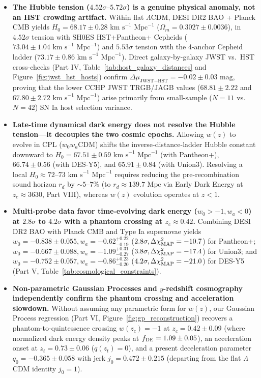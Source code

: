 \documentclass[11pt,letterpaper]{article}
\begin{document}
\begin{itemize}
    \setlength{\itemsep}{6pt}
    \item[\textcolor{tealaccent}{\textbullet}] \textbf{The Hubble tension ($4.52\sigma\text{--}5.72\sigma$) is a genuine physical anomaly, not an HST crowding artifact.} Within flat $\Lambda$CDM, DESI DR2 BAO + Planck CMB yields $H_0 = 68.17 \pm 0.28\text{ km s}^{-1}\text{ Mpc}^{-1}$ ($\Omega_m = 0.3027 \pm 0.0036$), in $4.52\sigma$ tension with SH0ES HST+Pantheon+ Cepheids ($73.04 \pm 1.04\text{ km s}^{-1}\text{ Mpc}^{-1}$) and $5.53\sigma$ tension with the 4-anchor Cepheid ladder ($73.17 \pm 0.86\text{ km s}^{-1}\text{ Mpc}^{-1}$). Direct galaxy-by-galaxy JWST vs.\ HST cross-checks (Part IV, Table~\ref{tab:host_galaxy_distances} and Figure~\ref{fig:jwst_hst_hosts}) confirm $\Delta\mu_{\text{JWST}-\text{HST}} = -0.02 \pm 0.03\text{ mag}$, proving that the lower CCHP JWST TRGB/JAGB values ($68.81 \pm 2.22$ and $67.80 \pm 2.72\text{ km s}^{-1}\text{ Mpc}^{-1}$) arise primarily from small-sample ($N=11$ vs.\ $N=42$) SN Ia host selection variance.
    \item[\textcolor{tealaccent}{\textbullet}] \textbf{Late-time dynamical dark energy does not resolve the Hubble tension---it decouples the two cosmic epochs.} Allowing $w(z)$ to evolve in CPL ($w_0 w_a$CDM) shifts the inverse-distance-ladder Hubble constant downward to $H_0 = 67.51 \pm 0.59\text{ km s}^{-1}\text{ Mpc}^{-1}$ (with Pantheon+), $66.74 \pm 0.56$ (with DES-Y5), and $65.91 \pm 0.84$ (with Union3). Resolving a local $H_0 \approx 72\text{--}73\text{ km s}^{-1}\text{ Mpc}^{-1}$ requires reducing the pre-recombination sound horizon $r_d$ by $\sim 5\text{--}7\%$ (to $r_d \approx 139.7\text{ Mpc}$ via Early Dark Energy at $z_c \approx 3630$, Part VIII), whereas $w(z)$ evolution operates at $z < 1$.
    \item[\textcolor{tealaccent}{\textbullet}] \textbf{Multi-probe data favor time-evolving dark energy ($w_0 > -1, w_a < 0$) at $2.8\sigma$ to $4.2\sigma$ with a phantom crossing at $z_c \approx 0.42$.} Combining DESI DR2 BAO with Planck CMB and Type Ia supernovae yields $w_0 = -0.838 \pm 0.055, w_a = -0.62^{+0.22}_{-0.19}$ ($2.8\sigma, \Delta\chi^2_{\rm MAP} = -10.7$) for Pantheon+; $w_0 = -0.667 \pm 0.088, w_a = -1.09^{+0.31}_{-0.27}$ ($3.8\sigma, \Delta\chi^2_{\rm MAP} = -17.4$) for Union3; and $w_0 = -0.752 \pm 0.057, w_a = -0.86^{+0.23}_{-0.20}$ ($4.2\sigma, \Delta\chi^2_{\rm MAP} = -21.0$) for DES-Y5 (Part V, Table~\ref{tab:cosmological_constraints}).
    \item[\textcolor{tealaccent}{\textbullet}] \textbf{Non-parametric Gaussian Processes and $y$-redshift cosmography independently confirm the phantom crossing and acceleration slowdown.} Without assuming any parametric form for $w(z)$, our Gaussian Process regression (Part VI, Figure~\ref{fig:gp_reconstruction}) recovers a phantom-to-quintessence crossing $w(z_c) = -1$ at $z_c = 0.42 \pm 0.09$ (where normalized dark energy density peaks at $f_{\rm DE} = 1.09 \pm 0.05$), an acceleration onset at $z_t = 0.73 \pm 0.06$ ($q(z_t) = 0$), and a present deceleration parameter $q_0 = -0.365 \pm 0.058$ with jerk $j_0 = 0.472 \pm 0.215$ (departing from the flat $\Lambda$CDM identity $j_0 = 1$).

\end{itemize}
\end{document}
